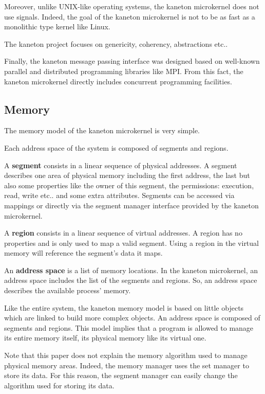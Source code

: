 {\begin{multicols}{2}
Moreover, unlike UNIX-like operating systems, the kaneton microkernel does
not use signals. Indeed, the goal of the kaneton microkernel is not to
be as fast as a monolithic type kernel like Linux.

The kaneton project focuses on genericity, coherency, abstractions etc..

Finally, the kaneton message passing interface was designed based on
well-known parallel and distributed programming libraries like MPI. From
this fact, the kaneton microkernel directly includes concurrent
programming facilities.

%
%

\subsection{Memory}

The memory model of the kaneton microkernel is very simple.

Each address space of the system is composed of segments and regions.

A \textbf{segment} consists in a linear sequence of physical addresses.
A segment describes one area of physical memory including the
first address, the last but also some properties like the owner of this
segment, the permissions: execution, read, write etc.. and some
extra attributes. Segments can be accessed via mappings or directly via
the segment manager interface provided by the kaneton microkernel.

A \textbf{region} consists in a linear sequence of virtual addresses.
A region has no properties and is only used to map a valid segment.
Using a region in the virtual memory will reference the segment's data
it maps.

An \textbf{address space} is a list of memory locations. In the kaneton
microkernel, an address space includes the list of the segments and regions.
So, an address space describes the available process' memory.

Like the entire system, the kaneton memory model is based on little objects
which are linked to build more complex objects. An address space is composed
of segments and regions. This model implies that a program is allowed to
manage its entire memory itself, its physical memory like its virtual one.

Note that this paper does not explain the memory algorithm used to manage
physical memory areas. Indeed, the memory manager uses the set manager
to store its data. For this reason, the segment manager can easily change
the algorithm used for storing its data.


\end{multicols}}
